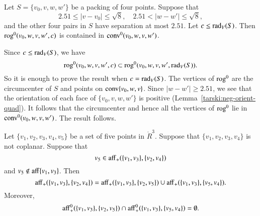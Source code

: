 \begin{tarskidata}
\begin{tarski}
\begin{lemma}
Let $S=\{v_0,v,w,w'\}$ be a packing of four points.
Suppose that
   $$
   2.51\le |v-v_0|\le\sqrt8,\quad 2.51< |w-w'|\le\sqrt8,
   $$
and the other four pairs in $S$ have separation at most $2.51$.
Let $c\le \operatorname{rad}_V(S)$.
Then ${\operatorname{rog}}^0(v_0,w,v,w',c)$ is contained in
${\operatorname{conv}}^0(v_0,w,v,w')$.
\end{lemma}

\begin{proved}  Since $c\le \operatorname{rad}_V(S)$, we have
  $$
  {\operatorname{rog}}^0(v_0,w,v,w',c)\subset {\operatorname{rog}}^0(v_0,w,v,w',\operatorname{rad}_V(S)).
  $$
So it is enough to prove the result when $c=\operatorname{rad}_V(S)$.
The vertices of ${\operatorname{rog}}^0$ are the circumcenter of $S$ and points
on ${\operatorname{conv}}\{v_0,w,v\}$.
Since $|w-w'|\ge 2.51$, we see that the orientation of each face
of $\{v_0,v,w,w'\}$ is positive (Lemma~\ref{tarski:neg-orient-quad}).   It follows that the circumcenter
and hence all
the vertices of ${\operatorname{rog}}^0$ lie in ${\operatorname{conv}}^0(v_0,w,v,w')$.
The result follows.
\swallowed\end{proved}
\end{tarski}





\begin{tarski}

\begin{lemma}
Let $\{v_1,v_2,v_3,v_4,v_5\}$ be a set of five
points in $\ring{R}^3$.  Suppose that $\{v_1,v_2,v_3,v_4\}$ is
not coplanar.  Suppose that 
    $$v_5\in {\operatorname{aff}}_+(\{v_1,v_3\},\{v_2,v_4\})$$
and $v_5\not\in{\operatorname{aff}}\{v_1,v_3\}$.
Then 
    $$
    {\operatorname{aff}}_+(\{v_1,v_3\},\{v_2,v_4\}) = 
{\operatorname{aff}}_+(\{v_1,v_3\},\{v_2,v_5\}) \cup
{\operatorname{aff}}_+(\{v_1,v_3\},\{v_5,v_4\}).
    $$
Moreover,
   $$
{\operatorname{aff}}^0_+(\{v_1,v_3\},\{v_2,v_5\}) \cap
{\operatorname{aff}}^0_+(\{v_1,v_3\},\{v_5,v_4\}) =\emptyset .
   $$
\end{lemma}


\end{tarski}
\end{tarskidata}
